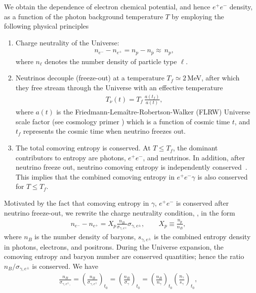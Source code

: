 We obtain the dependence of electron chemical potential, and hence $e^+e^-$ density, as a function of the photon background temperature $T$ by employing the following physical principles
\begin{enumerate}
\item Charge neutrality of the Universe:
\begin{align}\label{neutrality}
n_{e^-}-n_{{e^+}}=n_p-n_{\overline{p}}\approx\,n_p,
\end{align}
where $n_\ell$ denotes the number density of particle type $\ell$.
\item Neutrinos decouple (freeze-out) at a temperature $T_f\simeq 2$\,MeV, after which they free stream through the Universe with an effective temperature~\cite{Birrell:2012gg}
\begin{align}
 T_\nu(t)=T_f\,\frac{a(t_f)}{a(t)},
\end{align}
where $a(t)$ is the Friedmann-Lema\^{i}tre-Robertson-Walker (FLRW) Universe scale factor (see cosmology primer ) which is a function of cosmic time $t$, and $t_f$ represents the cosmic time when neutrino freezes out.
\item The total comoving entropy is conserved. At $T\leq T_f$, the dominant contributors to entropy are photons, $e^+e^-$, and neutrinos. In addition, after neutrino freeze out, neutrino comoving entropy is independently conserved~\cite{Birrell:2012gg}. This implies that the combined comoving entropy in $e^+e^-\gamma$ is also conserved for $T\leq T_f$.
\end{enumerate} 
Motivated by the fact that comoving entropy in $\gamma$, $e^+e^-$ is conserved after neutrino freeze-out, we rewrite the charge neutrality condition, , in the form
\begin{align}\label{charge_neutral_cond2}
n_{e^-}-n_{{e^+}}=X_p\frac{n_B}{\sigma_{\gamma,e^\pm}} \sigma_{\gamma,e^\pm},\qquad X_p\equiv\frac{n_p}{n_B},
\end{align}
where $n_B$ is the number density of baryons, $s_{\gamma,e^\pm}$ is the combined entropy density in photons, electrons, and positrons. During the Universe expansion, the comoving entropy and baryon number are conserved quantities; hence the ratio $n_B/\sigma_{\gamma,e^\pm}$ is conserved. We have
\begin{align}
\frac{n_B}{\sigma_{\gamma,e^\pm,}}=\left(\frac{n_B}{\sigma_{\gamma,e^\pm}}\right)_{t_0}\!\!\!\!=\left(\frac{n_B}{\sigma_{\gamma}}\right)_{t_0}\!\!\!\!=\left(\frac{n_B}{n_\gamma}\right)_{t_0}\left(\frac{n_\gamma}{s_{\gamma}}\right)_{t_0},
\end{align}
